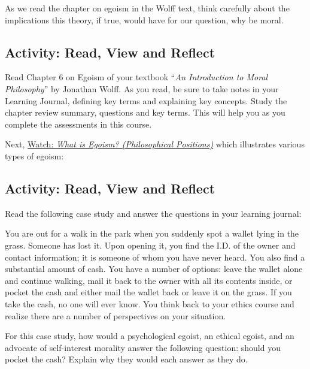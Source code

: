 \documentclass[
]{book}
\begin{document}
As we read the chapter on egoism in the Wolff text, think carefully about the implications this theory, if true, would have for our question, why be moral.

\hypertarget{activity-read-view-and-reflect-1}{%
\subsection*{Activity: Read, View and Reflect}\label{activity-read-view-and-reflect-1}}

\begin{reflect}
Read Chapter 6 on Egoism of your textbook ``\emph{An Introduction to Moral Philosophy}'' by Jonathan Wolff. As you read, be sure to take notes in your Learning Journal, defining key terms and explaining key concepts. Study the chapter review summary, questions and key terms. This will help you as you complete the assessments in this course.

Next, \href{https://www.youtube.com/watch?v=jpHggd-3_rM}{Watch: \emph{What is Egoism? (Philosophical Positions)}} which illustrates various types of egoism:
\end{reflect}

\hypertarget{activity-read-view-and-reflect-2}{%
\subsection*{Activity: Read, View and Reflect}\label{activity-read-view-and-reflect-2}}

\begin{reflect}
Read the following case study and answer the questions in your learning journal:

{You are out for a walk in the park when you suddenly spot a wallet lying in the grass. Someone has lost it. Upon opening it, you find the I.D. of the owner and contact information; it is someone of whom you have never heard. You also find a substantial amount of cash. You have a number of options: leave the wallet alone and continue walking, mail it back to the owner with all its contents inside, or pocket the cash and either mail the wallet back or leave it on the grass. If you take the cash, no one will ever know. You think back to your ethics course and realize there are a number of perspectives on your situation.}

For this case study, how would a psychological egoist, an ethical egoist, and an advocate of self-interest morality answer the following question: should you pocket the cash? Explain why they would each answer as they do.
\end{reflect}
\end{document}
